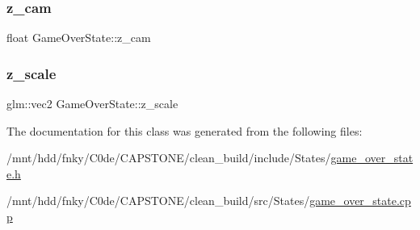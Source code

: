\subsubsection{\texorpdfstring{z\+\_\+cam}{z\_cam}}
{\footnotesize\ttfamily float Game\+Over\+State\+::z\+\_\+cam\hspace{0.3cm}{\ttfamily [private]}}

\mbox{\label{classGameOverState_a9b5f78804f2ec06ade38c0e69560f9b4}} 
\subsubsection{\texorpdfstring{z\+\_\+scale}{z\_scale}}
{\footnotesize\ttfamily glm\+::vec2 Game\+Over\+State\+::z\+\_\+scale\hspace{0.3cm}{\ttfamily [private]}}



The documentation for this class was generated from the following files\+:\begin{DoxyCompactItemize}
\item 
/mnt/hdd/fnky/\+C0de/\+C\+A\+P\+S\+T\+O\+N\+E/clean\+\_\+build/include/\+States/\hyperlink{game__over__state_8h}{game\+\_\+over\+\_\+state.\+h}\item 
/mnt/hdd/fnky/\+C0de/\+C\+A\+P\+S\+T\+O\+N\+E/clean\+\_\+build/src/\+States/\hyperlink{game__over__state_8cpp}{game\+\_\+over\+\_\+state.\+cpp}\end{DoxyCompactItemize}
